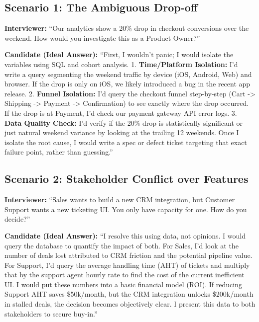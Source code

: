 \documentclass[
  11pt,
  openany,
  oneside]{book}
\begin{document}
\subsection{Scenario 1: The Ambiguous
Drop-off}\label{scenario-1-the-ambiguous-drop-off}

\textbf{Interviewer:} ``Our analytics show a 20\% drop in checkout
conversions over the weekend. How would you investigate this as a
Product Owner?''

\textbf{Candidate (Ideal Answer):} ``First, I wouldn't panic; I would
isolate the variables using SQL and cohort analysis. 1.
\textbf{Time/Platform Isolation:} I'd write a query segmenting the
weekend traffic by device (iOS, Android, Web) and browser. If the drop
is only on iOS, we likely introduced a bug in the recent app release. 2.
\textbf{Funnel Isolation:} I'd query the checkout funnel step-by-step
(Cart -\textgreater{} Shipping -\textgreater{} Payment -\textgreater{}
Confirmation) to see exactly where the drop occurred. If the drop is at
Payment, I'd check our payment gateway API error logs. 3. \textbf{Data
Quality Check:} I'd verify if the 20\% drop is statistically significant
or just natural weekend variance by looking at the trailing 12 weekends.
Once I isolate the root cause, I would write a spec or defect ticket
targeting that exact failure point, rather than guessing.''

\subsection{Scenario 2: Stakeholder Conflict over
Features}\label{scenario-2-stakeholder-conflict-over-features}

\textbf{Interviewer:} ``Sales wants to build a new CRM integration, but
Customer Support wants a new ticketing UI. You only have capacity for
one. How do you decide?''

\textbf{Candidate (Ideal Answer):} ``I resolve this using data, not
opinions. I would query the database to quantify the impact of both. For
Sales, I'd look at the number of deals lost attributed to CRM friction
and the potential pipeline value. For Support, I'd query the average
handling time (AHT) of tickets and multiply that by the support agent
hourly rate to find the cost of the current inefficient UI. I would put
these numbers into a basic financial model (ROI). If reducing Support
AHT saves \$50k/month, but the CRM integration unlocks \$200k/month in
stalled deals, the decision becomes objectively clear. I present this
data to both stakeholders to secure buy-in.''
\end{document}
